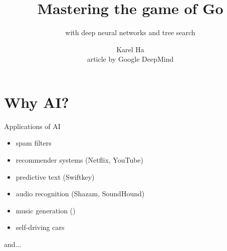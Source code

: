 \documentclass{beamer}
\title{Mastering the game of Go}
\subtitle{with deep neural networks and tree search}
\date{}                         %
\author{Karel Ha \\ article by Google DeepMind}
\institute{Spring School of Combinatorics 2016}
\begin{document}
  {
    \maketitle
  }


  \section{Why AI?}

  \begin{frame}{Applications of AI}
    \begin{itemize}[<+- | alert@+>]
      \item spam filters
      \item recommender systems (Netflix, YouTube)
      \item predictive text (Swiftkey)
      \item audio recognition (Shazam, SoundHound)
      \item music generation (\cite{DeepHear})
      \item self-driving cars
    \end{itemize}
    \pause

    and...
  \end{frame}
\end{document}
